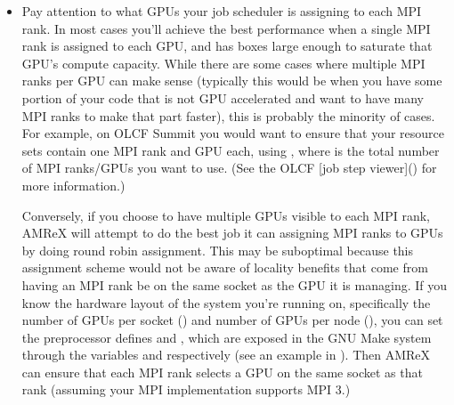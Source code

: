 \documentclass[letterpaper,10pt,english]{sphinxmanual}
\begin{document}
\begin{sphinxVerbatim}[commandchars=\\\{\}]
      
\end{sphinxVerbatim}
\begin{itemize}
\item {} 
\sphinxAtStartPar
Pay attention to what GPUs your job scheduler is assigning to each MPI
rank. In most cases you’ll achieve the best performance when a single
MPI rank is assigned to each GPU, and has boxes large enough to saturate
that GPU’s compute capacity. While there are some cases where multiple
MPI ranks per GPU can make sense (typically this would be when you have
some portion of your code that is not GPU accelerated and want to have
many MPI ranks to make that part faster), this is probably the minority
of cases. For example, on OLCF Summit you would want to ensure that your
resource sets contain one MPI rank and GPU each, using ,
where  is the total number of MPI ranks/GPUs you want to use. (See the OLCF
{[}job step viewer{]}() for more information.)

\sphinxAtStartPar
Conversely, if you choose to have multiple GPUs visible to each MPI rank,
AMReX will attempt to do the best job it can assigning MPI ranks to GPUs by
doing round robin assignment. This may be suboptimal because this assignment
scheme would not be aware of locality benefits that come from having an MPI
rank be on the same socket as the GPU it is managing. If you know the hardware
layout of the system you’re running on, specifically the number of GPUs per
socket () and number of GPUs per node (), you can set the preprocessor
defines  and , which are
exposed in the GNU Make system through the variables  and
 respectively (see an example in ).
Then AMReX can ensure that each MPI rank selects a GPU on the same socket as
that rank (assuming your MPI implementation supports MPI 3.)

\end{itemize}
\end{document}
